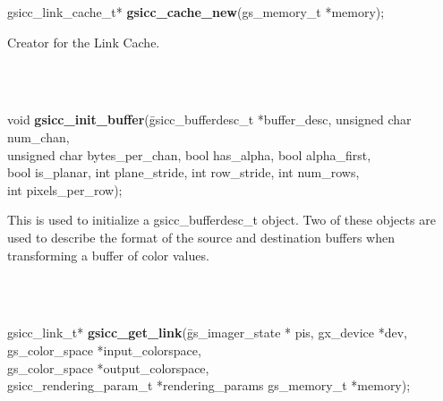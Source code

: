 \documentclass[12pt,notitlepage]{article}
\begin{document}
\singlespace

\noindent gsicc\_link\_cache\_t* {\bf gsicc\_cache\_new}(gs\_memory\_t *memory);\\

\begin{minipage}[h]{6.0in}
Creator for the Link Cache.
\end{minipage}\\
\\

\begin{tabbing}
\noindent void {\bf gsicc\_init\_buffer}(\=gsicc\_bufferdesc\_t *buffer\_desc, unsigned char num\_chan,\\
\>unsigned char bytes\_per\_chan, bool has\_alpha, bool alpha\_first,\\
\>bool is\_planar, int plane\_stride, int row\_stride, int num\_rows, \\
\> int pixels\_per\_row);\\
\end{tabbing}

\begin{minipage}[h]{6.0in}
This is used to initialize a gsicc\_bufferdesc\_t object. Two of these objects are used to describe the format of the source and destination buffers when transforming a buffer of color values.
\end{minipage}\\
\\

\begin{tabbing}
\noindent gsicc\_link\_t* {\bf gsicc\_get\_link}(\=gs\_imager\_state * pis, gx\_device *dev, gs\_color\_space  *input\_colorspace,\\
                                               \>gs\_color\_space *output\_colorspace,\\
                                               \> gsicc\_rendering\_param\_t *rendering\_params
                                               gs\_memory\_t
                                               *memory);\\
\end{tabbing}
\end{document}
